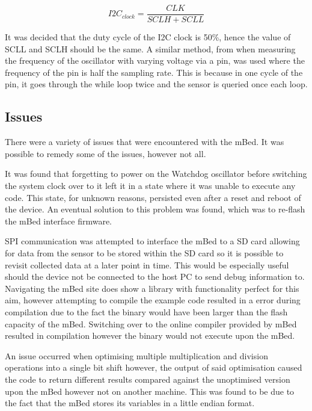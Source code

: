 \begin{equation}
	I2C_{clock} = \frac{CLK}{SCLH + SCLL}
	\label{eqn:i2c_clock}
\end{equation}

It was decided that the duty cycle of the I2C clock is 50\%, hence the value of SCLL and SCLH should be the same. A similar method, from when measuring the frequency of the oscillator with varying voltage via a pin, was used where the frequency of the pin is half the sampling rate. This is because in one cycle of the pin, it goes through the while loop twice and the sensor is queried once each loop.

\subsection{Issues}

There were a variety of issues that were encountered with the mBed. It was possible to remedy some of the issues, however not all.

It was found that forgetting to power on the Watchdog oscillator before switching the system clock over to it left it in a state where it was unable to execute any code. This state, for unknown reasons, persisted even after a reset and reboot of the device. An eventual solution to this problem was found, which was to re-flash the mBed interface firmware.

SPI communication was attempted to interface the mBed to a SD card allowing for data from the sensor to be stored within the SD card so it is possible to revisit collected data at a later point in time. This would be especially useful should the device not be connected to the host PC to send debug information to. Navigating the mBed site does show a library with functionality perfect for this aim, however attempting to compile the example code resulted in a error during compilation due to the fact the binary would have been larger than the flash capacity of the mBed. Switching over to the online compiler provided by mBed resulted in compilation however the binary would not execute upon the mBed.

An issue occurred when optimising multiple multiplication and division operations into a single bit shift however, the output of said optimisation caused the code to return different results compared against the unoptimised version upon the mBed however not on another machine. This was found to be due to the fact that the mBed stores its variables in a little endian format.

